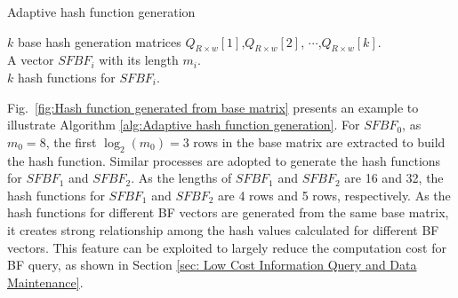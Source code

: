 \documentclass[10pt,journal,compsoc]{IEEEtran}
\begin{document}
\begin{algorithm}[h]
\caption{Adaptive hash function generation}
\label{alg:Adaptive hash function generation}
\begin{algorithmic}[1]
\REQUIRE
$k$ base hash generation matrices ${Q_{R \times w}}[1]$,${Q_{R \times w}}[2]$, $\cdots$,${Q_{R \times w}}[k]$. \\
A vector $SFBF_i$ with its length $m_i$.\\
\ENSURE
$k$ hash functions for $SFBF_i$.\\

\end{algorithmic}
\end{algorithm}

Fig.~\ref{fig:Hash function generated from base matrix} presents an example to illustrate Algorithm \ref{alg:Adaptive hash function generation}. For $SFBF_0$, as $m_0=8$, the first ${\log _2}\left( {{m_0}} \right)=3$ rows in the base matrix are extracted to build the hash function. Similar processes are adopted to generate the hash functions for $SFBF_1$ and $SFBF_2$. As the lengths of $SFBF_1$ and $SFBF_2$ are 16 and 32, the hash functions for $SFBF_1$ and $SFBF_2$ are 4 rows and 5 rows, respectively.  As the hash functions for different BF vectors are generated from the same base matrix, it creates strong relationship among the hash values calculated for different BF vectors. This feature can be exploited to largely reduce the computation cost for BF query, as shown in Section \ref{sec: Low Cost Information Query and Data Maintenance}.
\end{document}
